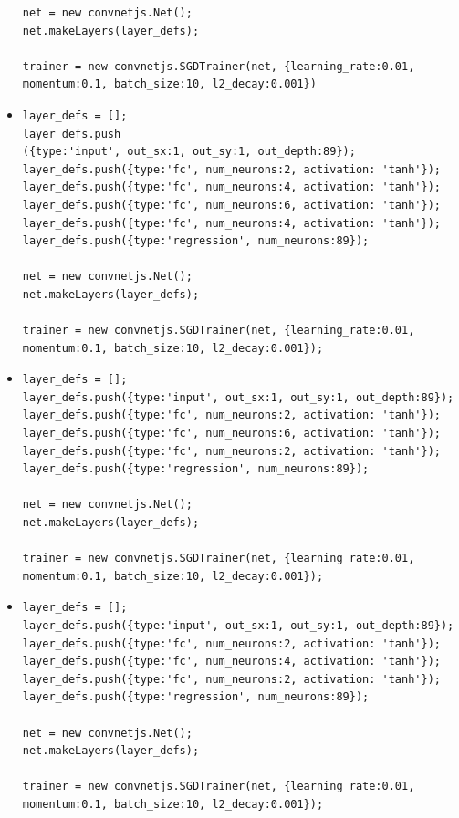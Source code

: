 \begin{itemize}
\begin{verbatim}
net = new convnetjs.Net();
net.makeLayers(layer_defs);

trainer = new convnetjs.SGDTrainer(net, {learning_rate:0.01, 
momentum:0.1, batch_size:10, l2_decay:0.001})
\end{verbatim}



\item \begin{verbatim}
layer_defs = [];
layer_defs.push
({type:'input', out_sx:1, out_sy:1, out_depth:89});
layer_defs.push({type:'fc', num_neurons:2, activation: 'tanh'});
layer_defs.push({type:'fc', num_neurons:4, activation: 'tanh'});
layer_defs.push({type:'fc', num_neurons:6, activation: 'tanh'});
layer_defs.push({type:'fc', num_neurons:4, activation: 'tanh'});
layer_defs.push({type:'regression', num_neurons:89});

net = new convnetjs.Net();
net.makeLayers(layer_defs);

trainer = new convnetjs.SGDTrainer(net, {learning_rate:0.01, 
momentum:0.1, batch_size:10, l2_decay:0.001});
\end{verbatim}


\item \begin{verbatim}
layer_defs = [];
layer_defs.push({type:'input', out_sx:1, out_sy:1, out_depth:89});
layer_defs.push({type:'fc', num_neurons:2, activation: 'tanh'});
layer_defs.push({type:'fc', num_neurons:6, activation: 'tanh'});
layer_defs.push({type:'fc', num_neurons:2, activation: 'tanh'});
layer_defs.push({type:'regression', num_neurons:89});

net = new convnetjs.Net();
net.makeLayers(layer_defs);

trainer = new convnetjs.SGDTrainer(net, {learning_rate:0.01, 
momentum:0.1, batch_size:10, l2_decay:0.001});
\end{verbatim}


\item \begin{verbatim}
layer_defs = [];
layer_defs.push({type:'input', out_sx:1, out_sy:1, out_depth:89});
layer_defs.push({type:'fc', num_neurons:2, activation: 'tanh'});
layer_defs.push({type:'fc', num_neurons:4, activation: 'tanh'});
layer_defs.push({type:'fc', num_neurons:2, activation: 'tanh'});
layer_defs.push({type:'regression', num_neurons:89});

net = new convnetjs.Net();
net.makeLayers(layer_defs);

trainer = new convnetjs.SGDTrainer(net, {learning_rate:0.01, 
momentum:0.1, batch_size:10, l2_decay:0.001});
\end{verbatim}



\end{itemize}
